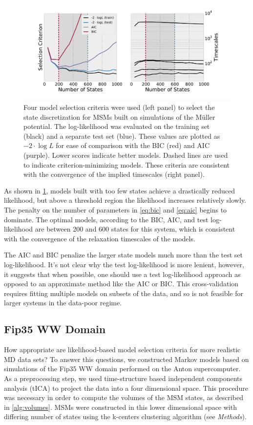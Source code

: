 \documentclass[journal=jpcbfk, layout=traditional, manuscript=article]{achemso}
\begin{document}
\begin{figure}[h]
\centering
\includegraphics[width=6in]{figs/mull/mull.pdf}
\caption{Four model selection criteria were used (left panel) to select the state discretization for MSMs built on simulations of the M\"{u}ller potential. The log-likelihood was evaluated on the training set (black) and a separate test set (blue). These values are plotted as $-2\cdot \log L$ for ease of comparison with the BIC (red) and AIC (purple). Lower scores indicate better models. Dashed lines are used to indicate criterion-minimizing models. These criteria are consistent with the convergence of the implied timescales (right panel).}
\label{fig:mullerlike}
\end{figure}

As shown in \cref{fig:mullerlike}, models built with too few states achieve a drastically reduced likelihood, but above a threshold region the likelihood increases relatively slowly. The penalty on the number of parameters in \cref{eq:bic} and \cref{eq:aic} begins to dominate. The optimal models, according to the BIC, AIC, and test log-likelihood are between 200 and 600 states for this system, which is consistent with the convergence of the relaxation timescales of the models. 

The AIC and BIC penalize the larger state models much more than the test set log-likelihood. It's not clear why the test log-likelihood is more lenient, however, it suggests that when possible, one should use a test log-likelihood approach as opposed to an approximate method like the AIC or BIC. This cross-validation requires fitting multiple models on subsets of the data, and so is not feasible for larger systems in the data-poor regime.

\subsection{Fip35 WW Domain}
How appropriate are likelihood-based model selection criteria for more realistic MD data sets? To answer this questions, we constructed Markov models based on simulations of the Fip35 WW domain\cite{Liu2008Experimental} performed on the Anton
supercomputer\cite{Shaw2010Atomic}. As a preprocessing step, we used time-structure based independent components analysis (tICA) to project the data into a four dimensional space. This procedure was necessary in order to compute the volumes of the MSM states, as described in \cref{alg:volumes}. MSMs were constructed in this lower dimensional space with differing number of states using the k-centers clustering algorithm (see \emph{Methods}).
\end{document}
